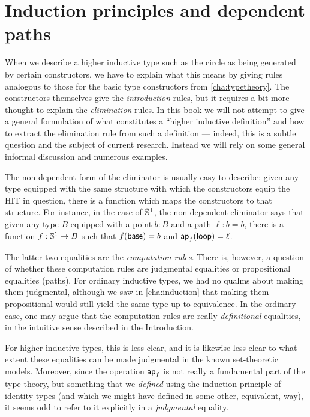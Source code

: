 \section{Induction principles and dependent paths}
\label{sec:dependent-paths}

When we describe a higher inductive type such as the circle as being generated by certain constructors, we have to explain what this means by giving rules analogous to those for the basic type constructors from \autoref{cha:typetheory}.
The constructors themselves give the \emph{introduction} rules, but it requires a bit more thought to explain the \emph{elimination} rules.
In this book we will not attempt to give a general formulation of what constitutes a ``higher inductive definition'' and how to extract the elimination rule from such a definition --- indeed, this is a subtle question and the subject of current research.
Instead we will rely on some general informal discussion and numerous examples.

The non-dependent form of the eliminator is usually easy to describe: given any type equipped with the same structure with which the constructors equip the HIT in question, there is a function which maps the constructors to that structure.
For instance, in the case of $\mathbb{S}^1$, the non-dependent eliminator says that given any type $B$ equipped with a point $b:B$ and a path $\ell:b=b$, there is a function $f:\mathbb{S}^1\to B$ such that $f(\mathsf{base})=b$ and $\mathsf{ap}_{f} (\mathsf{loop}) = \ell$.

The latter two equalities are the \emph{computation rules}.
There is, however, a question of whether these computation rules are judgmental equalities or propositional equalities (paths).
For ordinary inductive types, we had no qualms about making them judgmental, although we saw in \autoref{cha:induction} that making them propositional would still yield the same type up to equivalence.
In the ordinary case, one may argue that the computation rules are really \emph{definitional} equalities, in the intuitive sense described in the Introduction.

For higher inductive types, this is less clear, and it is likewise less clear to what extent these equalities can be made judgmental in the known set-theoretic models.
Moreover, since the operation $\mathsf{ap}_{f}$ is not really a fundamental part of the type theory, but something that we \emph{defined} using the induction principle of identity types (and which we might have defined in some other, equivalent, way), it seems odd to refer to it explicitly in a \emph{judgmental} equality.

